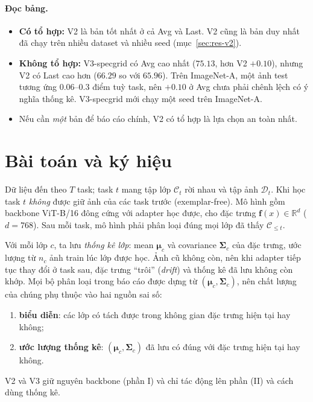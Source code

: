 \documentclass[11pt]{article}
\newcommand{\R}{\mathbb{R}}
\newcommand{\bmu}{\boldsymbol{\mu}}
\newcommand{\bSigma}{\boldsymbol{\Sigma}}
\newcommand{\vf}{\mathbf{f}}
\begin{document}
\paragraph{Đọc bảng.}
\begin{itemize}
\item \textbf{Có tổ hợp:} V2 là bản tốt nhất ở cả Avg và Last. V2 cũng là bản duy nhất đã chạy trên nhiều dataset và nhiều
      seed (mục~\ref{sec:res-v2}).
\item \textbf{Không tổ hợp:} V3-specgrid có Avg cao nhất ($75.13$, hơn V2 $+0.10$), nhưng V2 có Last cao hơn ($66.29$ so
      với $65.96$). Trên ImageNet-A, một ảnh test tương ứng $0.06$--$0.3$ điểm tuỳ task, nên $+0.10$ ở Avg chưa phải
      chênh lệch có ý nghĩa thống kê. V3-specgrid mới chạy một seed trên ImageNet-A.
\item Nếu cần \emph{một} bản để báo cáo chính, V2 có tổ hợp là lựa chọn an toàn nhất.
\end{itemize}

\section{Bài toán và ký hiệu}\label{sec:setup}

Dữ liệu đến theo $T$ task; task $t$ mang tập lớp $\mathcal{C}_t$ rời nhau và tập ảnh $\mathcal{D}_t$. Khi học task
$t$ \emph{không} được giữ ảnh của các task trước (exemplar-free). Mô hình gồm backbone ViT-B/16 đông cứng với adapter
học được, cho đặc trưng $\vf(x)\in\R^d$ ($d=768$). Sau mỗi task, mô hình phải phân loại đúng mọi lớp đã thấy
$\mathcal{C}_{\le t}$.

Với mỗi lớp $c$, ta lưu \emph{thống kê lớp}: mean $\bmu_c$ và covariance $\bSigma_c$ của đặc trưng, ước lượng từ
$n_c$ ảnh train lúc lớp được học. Ảnh cũ không còn, nên khi adapter tiếp tục thay đổi ở task sau, đặc trưng ``trôi''
(\emph{drift}) và thống kê đã lưu không còn khớp. Mọi bộ phân loại trong báo cáo được dựng từ $(\bmu_c,\bSigma_c)$,
nên chất lượng của chúng phụ thuộc vào hai nguồn sai số:
\begin{enumerate}
\item[(I)] \textbf{biểu diễn}: các lớp có tách được trong không gian đặc trưng hiện tại hay không;
\item[(II)] \textbf{ước lượng thống kê}: $(\bmu_c,\bSigma_c)$ đã lưu có đúng với đặc trưng hiện tại hay không.
\end{enumerate}
V2 và V3 giữ nguyên backbone (phần I) và chỉ tác động lên phần (II) và cách dùng thống kê.
\end{document}

